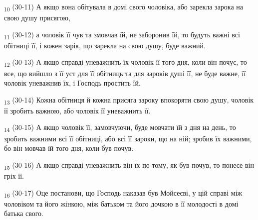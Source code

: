 \begin{tcolorbox}
\textsubscript{10} (30-11) А якщо вона обітувала в домі свого чоловіка, або зарекла зарока на свою душу присягою,
\end{tcolorbox}
\begin{tcolorbox}
\textsubscript{11} (30-12) а чоловік її чув та змовчав їй, не заборонив їй, то будуть важні всі обітниці її, і кожен зарік, що зарекла на свою душу, буде важний.
\end{tcolorbox}
\begin{tcolorbox}
\textsubscript{12} (30-13) А якщо справді уневажнить їх чоловік її того дня, коли він почує, то все, що вийшло з її уст для її обітниць та для зароків душі її, не буде важне, її чоловік уневажнив їх, і Господь простить їй.
\end{tcolorbox}
\begin{tcolorbox}
\textsubscript{13} (30-14) Кожна обітниця й кожна присяга зароку впокоряти свою душу, чоловік її зробить важною, або чоловік її уневажнить її.
\end{tcolorbox}
\begin{tcolorbox}
\textsubscript{14} (30-15) А якщо чоловік її, замовчуючи, буде мовчати їй з дня на день, то зробить важними всі її обітниці, або всі її зароки, що на ній; зробив їх важними, бо він мовчав їй того дня, коли був почув.
\end{tcolorbox}
\begin{tcolorbox}
\textsubscript{15} (30-16) А якщо справді уневажнить він їх по тому, як був почув, то понесе він гріх її.
\end{tcolorbox}
\begin{tcolorbox}
\textsubscript{16} (30-17) Оце постанови, що Господь наказав був Мойсеєві, у цій справі між чоловіком та його жінкою, між батьком та його дочкою в її молодості в домі батька свого.
\end{tcolorbox}
